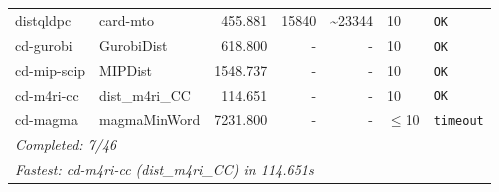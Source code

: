 \begin{longtable}{llrrrl p{}}
distqldpc & card-mto & 455.881 & 15840 & \textasciitilde{}23344 & 10 & \texttt{OK} \\
cd-gurobi & GurobiDist & 618.800 & - & - & 10 & \texttt{OK} \\
cd-mip-scip & MIPDist & 1548.737 & - & - & 10 & \texttt{OK} \\
cd-m4ri-cc & dist\_m4ri\_CC & 114.651 & - & - & 10 & \texttt{OK} \\
cd-magma & magmaMinWord & 7231.800 & - & - & $\leq$10 & \texttt{timeout} \\
\midrule
\multicolumn{7}{l}{\textit{Completed: 7/46}} \\
\multicolumn{7}{l}{\textit{Fastest: cd-m4ri-cc (dist\_m4ri\_CC) in 114.651s}} \\
\end{longtable}
